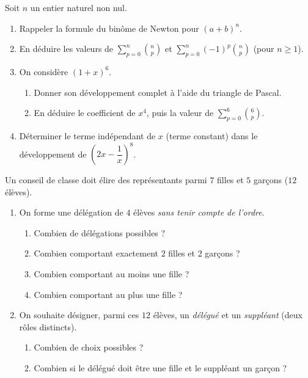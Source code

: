 Soit $n$ un entier naturel non nul.
\begin{enumerate}[label=\arabic*)]
\item Rappeler la formule du binôme de Newton pour $(a+b)^{n}$.
\item En déduire les valeurs de $\displaystyle\sum_{p=0}^{n}\binom np$ et
$\displaystyle\sum_{p=0}^{n}(-1)^{p}\binom np$ (pour $n\ge1$).
\item On considère $(1+x)^{6}$.
\begin{enumerate}[label=\alph*)]
\item Donner son développement complet à l'aide du triangle de Pascal.
\item En déduire le coefficient de $x^{4}$, puis la valeur de $\displaystyle\sum_{p=0}^{6}\binom 6p$.
\end{enumerate}
\item Déterminer le terme indépendant de $x$ (terme constant) dans le développement de
$\left(2x-\dfrac{1}{x}\right)^{8}$.
\end{enumerate}

Un conseil de classe doit élire des représentants parmi $7$ filles et $5$ garçons
($12$ élèves).
\begin{enumerate}[label=\arabic*)]
\item On forme une délégation de $4$ élèves \emph{sans tenir compte de l'ordre}.
\begin{enumerate}[label=\alph*)]
\item Combien de délégations possibles ?
\item Combien comportant exactement $2$ filles et $2$ garçons ?
\item Combien comportant au moins une fille ?
\item Combien comportant au plus une fille ?
\end{enumerate}
\item On souhaite désigner, parmi ces $12$ élèves, un \emph{délégué} et un \emph{suppléant}
(deux rôles distincts).
\begin{enumerate}[label=\alph*)]
\item Combien de choix possibles ?
\item Combien si le délégué doit être une fille et le suppléant un garçon ?
\end{enumerate}
\end{enumerate}

